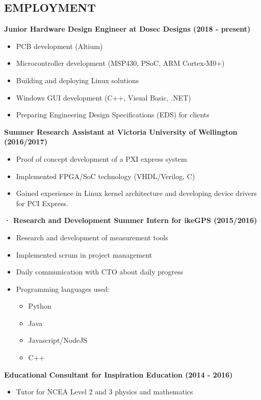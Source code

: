 \documentclass[3pt]{res}
\begin{document}
\begin{resume}
\section{EMPLOYMENT}
\vspace{0.1in}
   {\bf Junior Hardware Design Engineer at Dosec Designs (2018 - present)}
       \begin{itemize}[noitemsep]
      \item PCB development (Altium)
      \item Microcontroller development (MSP430, PSoC, ARM Cortex-M0+)
      \item Building and deploying Linux solutions
      \item Windows GUI development (C++, Visual Basic, .NET)
      \item Preparing Engineering Design Specifications (EDS) for clients
    \end{itemize}
   {\bf Summer Research Assistant at Victoria University of Wellington (2016/2017)}
    \begin{itemize}[noitemsep]
      \item Proof of concept development of a PXI express system
      \item Implemented FPGA/SoC technology (VHDL/Verilog, C)
      \item Gained experience in Linux kernel architecture and developing device drivers for PCI Express.
    \end{itemize}
    {\bf ·	Research and Development Summer Intern for ikeGPS (2015/2016)}
    \begin{itemize}[noitemsep] %
      \item Research and development of measurement tools
      \item Implemented scrum in project management
      \item Daily communication with CTO about daily progress
      \item Programming languages used:
      \begin{itemize}
      \item Python
      \item Java
      \item Javascript/NodeJS
      \item C++
    \end{itemize}
      \end{itemize}
    {\bf Educational Consultant for Inspiration Education (2014 - 2016)}
    \begin{itemize}[noitemsep]
      \item Tutor for NCEA Level 2 and 3 physics and mathematics
    \end{itemize}


\end{resume}
\end{document}
